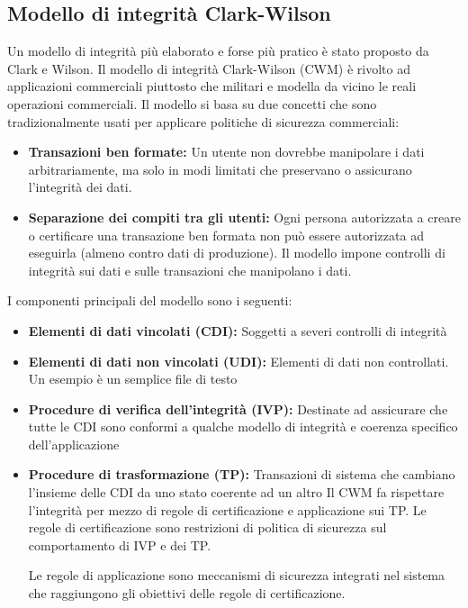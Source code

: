 \subsection{Modello di integrità Clark-Wilson}
Un modello di integrità più elaborato e forse più pratico è stato proposto da Clark e Wilson. Il modello di integrità Clark-Wilson (CWM) è rivolto ad applicazioni commerciali piuttosto che militari e modella da vicino le reali operazioni commerciali. Il modello si basa su due concetti che sono tradizionalmente usati per applicare politiche di sicurezza commerciali:
\begin{itemize}
    \item \textbf{Transazioni ben formate:} Un utente non dovrebbe manipolare i dati arbitrariamente, ma solo in modi limitati che preservano o assicurano l'integrità dei dati.
    
    \item \textbf{Separazione dei compiti tra gli utenti:} Ogni persona autorizzata a creare o certificare una transazione ben formata non può essere autorizzata ad eseguirla (almeno contro dati di produzione). Il modello impone controlli di integrità sui dati e sulle transazioni che manipolano i dati.
\end{itemize}
I componenti principali del modello sono i seguenti:
\begin{itemize}
    \item \textbf{Elementi di dati vincolati (CDI):} Soggetti a severi controlli di integrità
    
    \item \textbf{Elementi di dati non vincolati (UDI):} Elementi di dati non controllati. Un esempio è un semplice file di testo
    
    \item \textbf{Procedure di verifica dell'integrità (IVP):} Destinate ad assicurare che tutte le CDI sono conformi a qualche modello di integrità e coerenza specifico dell'applicazione
    
    \item \textbf{Procedure di trasformazione (TP):} Transazioni di sistema che cambiano l'insieme delle CDI da uno stato coerente ad un altro Il CWM fa rispettare l'integrità per mezzo di regole di certificazione e applicazione sui TP. Le regole di certificazione sono restrizioni di politica di sicurezza sul comportamento di IVP e dei TP. 
    
Le regole di applicazione sono meccanismi di sicurezza integrati nel sistema che raggiungono gli obiettivi delle regole di certificazione.
\end{itemize}

